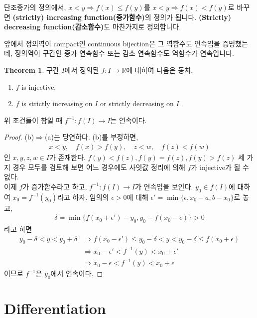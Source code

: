 \documentclass[12pt]{article}
\theoremstyle{definition}
\newtheorem{thm}{Theorem}[section]
\def\RR{\mathbb{R}}
\def\eps{\epsilon}
\begin{document}
단조증가의 정의에서, \(x < y \Longrightarrow f(x) \le f(y)\)를 \(x < y \Longrightarrow f(x) < f(y)\)로 바꾸면 \textbf{(strictly) increasing function(증가함수)}의 정의가 됩니다. \textbf{(Strictly) decreasing function(감소함수)}도 마찬가지로 정의합니다.

앞에서 정의역이 compact인 continuous bijection은 그 역함수도 연속임을 증명했는데, 정의역이 구간인 증가 연속함수 또는 감소 연속함수도 역함수가 연속입니다.

\begin{thm}
	구간 \(I\)에서 정의된 \(f: I \rightarrow \RR\)에 대하여 다음은 동치.
	\begin{enumerate} [label=(\alph*), leftmargin=2\parindent]
		\item
		\(f\) is injective.
		\item
		\(f\) is strictly increasing on \(I\) or strictly decreasing on \(I\).
	\end{enumerate}
	위 조건들이 참일 때 \(f^{-1}: f(I) \rightarrow I\)는 연속이다.
\end{thm}
\begin{proof}
	(b)$\Rightarrow$(a)는 당연하다. (b)를 부정하면,
	\begin{gather*}
		x < y, \quad f(x) > f(y), \quad z < w, \quad f(z) < f(w)
	\end{gather*}
	인 \(x, y, z, w \in I\)가 존재한다. \(f(y) < f(z), f(y) = f(z), f(y) > f(z)\) 세 가지 경우 모두를 검토해 보면 어느 경우에도 사잇값 정리에 의해 \(f\)가 injective가 될 수 없다.\\
	이제 \(f\)가 증가함수라고 하고, \(f^{-1}: f(I) \rightarrow I\)가 연속임을 보인다. \(y_0 \in f(I)\)에 대하여 \(x_0 = f^{-1}(y_0)\)라고 하자. 임의의 \(\eps > 0\)에 대해 \(\eps' = \min\{\eps, x_0-a, b-x_0\}\)로 놓고,
	\begin{gather*}
		\delta = \min \{f(x_0 + \eps') - y_0, y_0 - f(x_0 - \eps)\} > 0
	\end{gather*}
	라고 하면
	\begin{align*}
		y_0 - \delta < y < y_0 + \delta &\Longrightarrow f(x_0 - \eps') \le y_0 - \delta < y < y_0 - \delta \le f(x_0 + \eps)\\
		&\Longrightarrow x_0 - \eps' < f^{-1}(y) < x_0 + \eps'\\
		&\Longrightarrow x_0 - \eps < f^{-1}(y) < x_0 + \eps
	\end{align*}
	이므로 \(f^{-1}\)은 \(y_0\)에서 연속이다.
\end{proof}

\newpage

\section{Differentiation}
\end{document}
